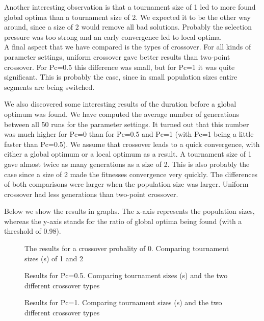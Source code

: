 \documentclass[10pt,a4paper,onecolumn]{article}
\begin{document}
Another interesting observation is that a tournament size of 1 led to more found global optima than a tournament size of 2.
We expected it to be the other way around, since a size of 2 would remove all bad solutions.
Probably the selection pressure was too strong and an early convergence led to local optima.\\

A final aspect that we have compared is the types of crossover. For all kinds of parameter settings, uniform crossover gave better results than two-point crossover.
For Pc=0.5 this difference was small, but for Pc=1 it was quite significant. This is probably the case, since in small population sizes entire segments are being switched.

We also discovered some interesting results of the duration before a global optimum was found. 
We have computed the average number of generations between all 50 runs for the parameter settings.
It turned out that this number was much higher for Pc=0 than for Pc=0.5 and Pc=1 (with Pc=1 being a little faster than Pc=0.5).
We assume that crossover leads to a quick convergence, with either a global optimum or a local optimum as a result.
A tournament size of 1 gave almost twice as many generations as a size of 2.
This is also probably the case since a size of 2 made the fitnesses convergence very quickly.
The differences of both comparisons were larger when the population size was larger.
Uniform crossover had less generations than two-point crossover.

Below we show the results in graphs. The x-axis represents the population sizes, whereas the y-axis stands for the ratio of global optima being found (with a threshold of 0.98).

\begin{figure}
    \centering
    \caption{The results for a crossover probality of 0. Comparing tournament sizes (s) of 1 and 2}
\end{figure}

\begin{figure}
    \centering
    \caption{Results for Pc=0.5. Comparing tournament sizes (s) and the two different crossover types}
\end{figure}

\begin{figure}
    \centering
    \caption{Results for Pc=1. Comparing tournament sizes (s) and the two different crossover types}
\end{figure}
\end{document}
